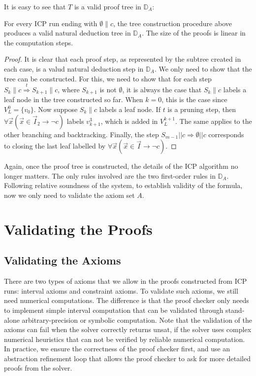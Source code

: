 \documentclass{llncs}
\begin{document}
It is easy to see that $T$ is a valid proof tree in $\mathbb{D}_A$:

\begin{proposition}\label{successful_tree}
For every ICP run ending with $\emptyset\parallel c$, the tree construction procedure above produces a valid natural deduction tree in $\mathbb{D}_A$. The size of the proofs is linear in the computation steps.
\end{proposition}

\begin{proof}
It is clear that each proof step, as represented by the subtree created in each case, is a valud natural deduction step in $\mathbb{D}_A$. We only need to show that the tree can be constructed. For this, we need to show that for each step $S_k\parallel c\stackrel{t}{\Longrightarrow} S_{k+1}\parallel c$, where $S_{k+1}$ is not $\emptyset$, it is always the case that $S_k\parallel c$ labels a leaf node in the tree constructed so far. When $k=0$, this is the case since $V_L^0 = \{v_0\}$. Now suppose $S_k\parallel c$ labels a leaf node. If $t$ is a pruning step, then $\forall \vec x(\vec x\in \vec I_2\rightarrow \neg c)$ labels $v^3_{k+1}$, which is added in $V_L^{k+1}$. The same applies to the other branching and backtracking. Finally, the step $S_{m-1}||c\Longrightarrow \emptyset||c$ corresponds to closing the last leaf labelled by $\forall \vec x(\vec x \in \vec I\rightarrow \neg c)$.
\end{proof}
Again, once the proof tree is constructed, the details of
the ICP algorithm no longer matters.  The only rules involved are the two
first-order rules in $\mathbb{D}_{A}$. Following relative soundness of the
system, to establish validity of the formula, now we only need to validate the
axiom set $A$.

\section{Validating the Proofs}\label{validate}

\subsection{Validating the Axioms}

There are two types of axioms that we allow in the proofs constructed from ICP runs: interval axioms and constraint axioms. To validate such axioms, we still need numerical computations. The difference is that the proof checker only needs to implement simple interval computation that can be validated through stand-alone arbitrary-precision or symbolic computation. Note that the validation of the axioms can fail when the solver correctly returns {\sf unsat}, if the solver uses complex numerical heuristics that can not be verified by reliable numerical computation. In practice, we ensure the correctness of the proof checker first, and use an abstraction refinement loop that allows the proof checker to ask for more detailed proofs from the solver.
\end{document}
